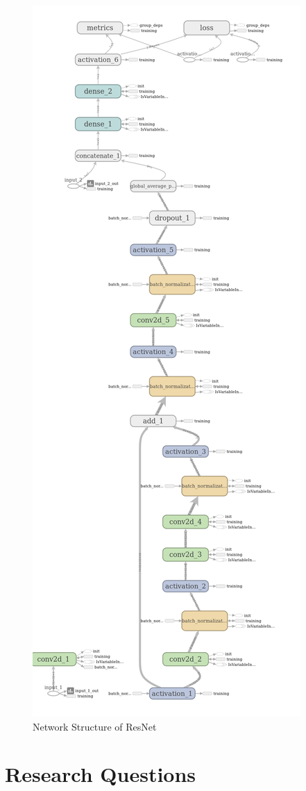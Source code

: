 \documentclass[letterpaper, 10 pt, conference]{../ieeeconf}
\begin{document}
\begin{figure}[t!]
    \centering
        \includegraphics[width=0.7\columnwidth]{figs/balanced_resnet.png}
    \caption{Network Structure of ResNet} \label{fig:res_net}
\end{figure}

\section{Research Questions}
\label{sec:questions}
\end{document}
